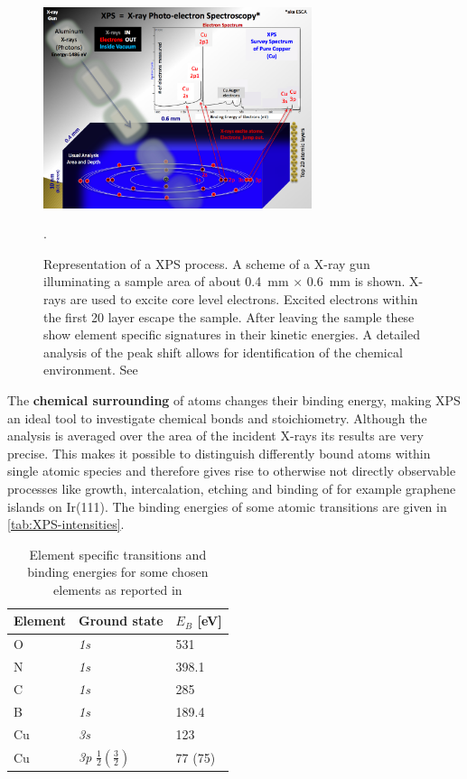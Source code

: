 \begin{figure}\centering
\includegraphics[width=0.7\textwidth]{./images/XPS_PHYSICS}
		\label{fig:XPS-excitation}
	\caption{Representation of a XPS process. A scheme of a X-ray gun illuminating a sample area of about \SI{0.4}{\milli \meter} $\times$ \SI{0.6}{\milli \meter} is shown. X-rays are used to excite core level electrons. Excited electrons within the first 20 layer escape the sample. After leaving the sample these show element specific signatures in their kinetic energies. A detailed analysis of the peak shift allows for identification of the chemical environment. See \cite{noauthor_xps_physics.png_2015}}.
	\label{fig:auger-core}
\end{figure}

The  \textbf{chemical surrounding} of atoms changes their binding energy, making XPS an ideal tool to investigate chemical bonds and stoichiometry. Although the analysis is averaged over the area of the incident X-rays its results are very precise. This makes it possible to distinguish differently bound atoms within single atomic species and therefore gives rise to otherwise not directly observable processes like growth, intercalation, etching and binding of for example 
graphene islands on Ir(111)\cite{busse_graphene_2011-1,granas_oxygen_2012}.
The  binding energies of some atomic transitions are given in \autoref{tab:XPS-intensities}.

\begin{table}\centering
 \caption{Element specific transitions and binding energies for some chosen elements as reported in \cite{wanger_handbook_1979}}
 \begin{tabular}{lll}
  Element & Ground state & $E_B$ [eV]\\ \hline 
  O & \textit{1s} & 531\\
  N & \textit{1s} & 398.1\\
  C & \textit{1s} & 285\\
  B & \textit{1s} & 189.4 \\
  Cu & \textit{3s} & 123\\
  Cu & \textit{3p} $\frac{1}{2} (\frac{3}{2})$ & 77 (75)\\
 \end{tabular}
\label{tab:XPS-intensities}
\end{table}

